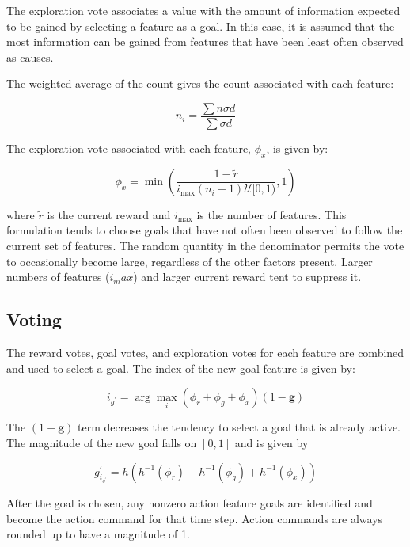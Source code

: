 The exploration vote associates a value with the amount of information expected to be gained by selecting a feature as a goal. In this case, it is assumed that the most information can be gained from features that have been least often observed as causes.

The weighted average of the count gives the count associated with each feature:

\begin{equation}
n_i =   \frac{\sum n \sigma d}{\sum \sigma d} 
\end{equation}

The exploration vote associated with each feature, $\phi_x$, is given by:

\begin{equation}
\phi_x = \min \left ( \frac{1 - \tilde{r}}{i_{\max} (n_i + 1) \mathcal{U}[0, 1)} , 1 \right )
\end{equation}

where $\tilde{r}$ is the current reward and $i_{\max}$ is the number of features. This formulation tends to choose goals that have not often been observed to follow the current set of features. The random quantity in the denominator permits the vote to occasionally become large, regardless of the other factors present. Larger numbers of features ($i_max$) and larger current reward tent to suppress it.

\subsection{Voting}

The reward votes, goal votes, and exploration votes for each feature are combined and used to select a goal. The index of the new goal feature is given by: 

\begin{equation}
i_{g^{\prime}} = \arg \max_i (\phi_r + \phi_g + \phi_x) (1 - \mathbf{g})
\end{equation}

The $ (1 - \mathbf{g})$ term decreases the tendency to select a goal that is already active. The magnitude of the new goal falls on $[0, 1]$ and is given by 

\begin{equation}
g^{\prime}_{i_{g^{\prime}}} = h( h^{-1}(\phi_r) + h^{-1}(\phi_g) + h^{-1}(\phi_x))
\end{equation}

After the goal is chosen, any nonzero action feature goals are identified and become the action command for that time step. Action commands are always rounded up to have a magnitude of 1.



